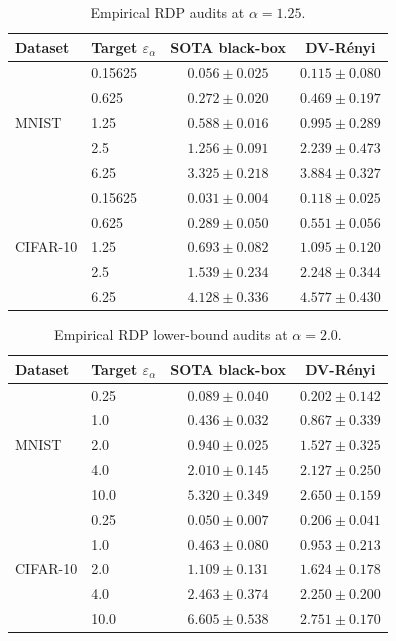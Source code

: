 \documentclass{article}
\theoremstyle{plain}
\theoremstyle{definition}
\theoremstyle{remark}
\begin{document}
\begin{table}
\centering
\caption{Empirical RDP audits at $\alpha=1.25$.}
\label{tab:alpha125-1.0main}
{%
\begin{tabular}{llcc}
\toprule
Dataset & Target $\varepsilon_\alpha$ & SOTA black-box  & DV-R\'enyi \\
\midrule
\multirow{5}{*}{MNIST} & 0.15625 & $0.056 \pm 0.025$ & $\mathbf{0.115} \pm 0.080$ \\
 & 0.625 & $0.272 \pm 0.020$ & $\mathbf{0.469} \pm 0.197$ \\
 & 1.25 & $0.588 \pm 0.016$ & $\mathbf{0.995} \pm 0.289$ \\
 & 2.5 & $1.256 \pm 0.091$ & $\mathbf{2.239} \pm 0.473$ \\
 & 6.25 & $3.325 \pm 0.218$ & $\mathbf{3.884} \pm 0.327$ \\
\midrule
\multirow{5}{*}{CIFAR-10} & 0.15625 & $0.031 \pm 0.004$ & $\mathbf{0.118} \pm 0.025$ \\
 & 0.625 & $0.289 \pm 0.050$ & $\mathbf{0.551} \pm 0.056$ \\
 & 1.25 & $0.693 \pm 0.082$ & $\mathbf{1.095} \pm 0.120$ \\
 & 2.5 & $1.539 \pm 0.234$ & $\mathbf{2.248} \pm 0.344$ \\
 & 6.25 & $4.128 \pm 0.336$ & $\mathbf{4.577} \pm 0.430$ \\
\bottomrule
\end{tabular}%
}
\end{table}

\begin{table}
\centering
\caption{Empirical RDP lower-bound audits at $\alpha=2.0$.}
\label{tab:alpha2-1.0main}
{%
\begin{tabular}{llcc}
\toprule
Dataset & Target $\varepsilon_\alpha$ & SOTA black-box  & DV-R\'enyi \\
\midrule
\multirow{5}{*}{MNIST} 
 & 0.25 & $0.089 \pm 0.040$ & $\mathbf{0.202} \pm 0.142$ \\
 & 1.0  & $0.436 \pm 0.032$ & $\mathbf{0.867} \pm 0.339$ \\
 & 2.0  & $0.940 \pm 0.025$ & $\mathbf{1.527} \pm 0.325$ \\
 & 4.0  & $2.010 \pm 0.145$ & $\mathbf{2.127} \pm 0.250$ \\
 & 10.0 & $\mathbf{5.320} \pm 0.349$ & $2.650 \pm 0.159$ \\
\midrule
\multirow{5}{*}{CIFAR-10} 
 & 0.25 & $0.050 \pm 0.007$ & $\mathbf{0.206} \pm 0.041$ \\
 & 1.0  & $0.463 \pm 0.080$ & $\mathbf{0.953} \pm 0.213$ \\
 & 2.0  & $1.109 \pm 0.131$ & $\mathbf{1.624} \pm 0.178$ \\
 & 4.0  & $\mathbf{2.463} \pm 0.374$ & $2.250 \pm 0.200$ \\
 & 10.0 & $\mathbf{6.605} \pm 0.538$ & $2.751 \pm 0.170$ \\
\bottomrule
\end{tabular}%
}
\end{table}
\end{document}
